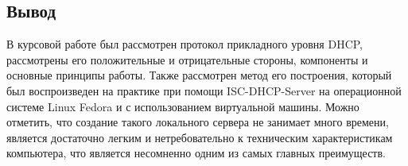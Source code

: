 
\begin{center}
	\section*{Вывод}
\end{center}

В курсовой работе был рассмотрен протокол прикладного уровня DHCP, рассмотрены его положительные и отрицательные стороны, компоненты и основные принципы работы. Также рассмотрен метод его построения, который был воспроизведен на практике при помощи ISC-DHCP-Server на операционной системе Linux Fedora и с использованием виртуальной машины. Можно отметить, что создание такого локального сервера не занимает много времени, является достаточно легким и нетребовательно к техническим характеристикам компьютера, что является несомненно одним из самых главных преимуществ.